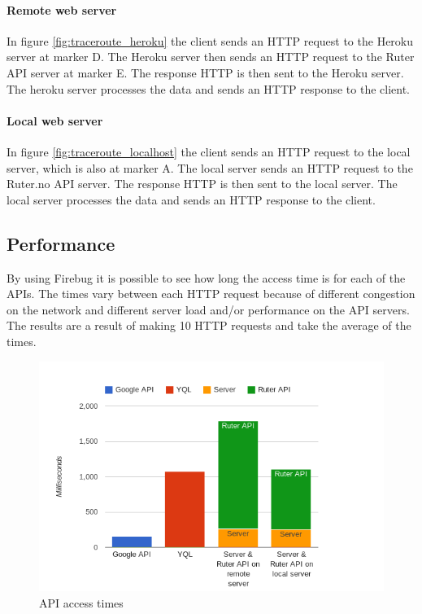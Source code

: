 \documentclass[10pt,a4paper]{article}
\begin{document}
\paragraph{Remote web server}
In figure \ref{fig:traceroute_heroku} the client sends an HTTP request to the Heroku server at marker D. The Heroku server then sends an HTTP request to the Ruter API server at marker E. The response HTTP is then sent to the Heroku server. The heroku server processes the data and sends an HTTP response to the client.
\paragraph{Local web server}
In figure \ref{fig:traceroute_localhost} the client sends an HTTP request to the local server, which is also at marker A. The local server sends an HTTP request to the Ruter.no API server. The response HTTP is then sent to the local server. The local server processes the data and sends an HTTP response to the client.




\subsection{Performance}
\label{sec:performance}
By using Firebug it is possible to see how long the access time is for each of the APIs. The times vary between each HTTP request because of different congestion on the network and different server load and/or performance on the API servers. The results are a result of making 10 HTTP requests and take the average of the times. 
\begin{figure}
\centering
\includegraphics[width=\textwidth]{../apitimes/apitider}
\caption{API access times}
\label{fig:time}
\end{figure}
\end{document}
